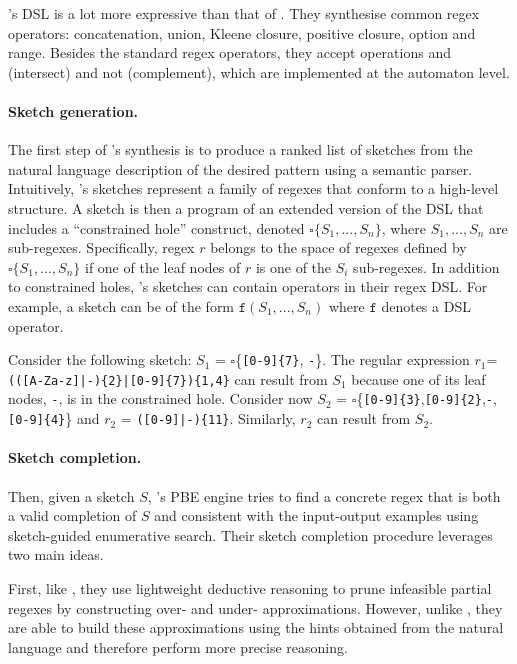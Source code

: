 \Regel's \ac{DSL} is a lot more expressive than that of \AlphaRegex. They synthesise common regex operators: concatenation, union, Kleene closure, positive closure, option and range. Besides the standard regex operators, they accept operations and (intersect) and not (complement), which are implemented at the automaton level.

\paragraph{Sketch generation.}
The first step of \Regel's synthesis is to produce a ranked list of sketches from the natural language description of the desired pattern using a semantic parser. Intuitively, \Regel's sketches represent a family of regexes that conform to a high-level structure. A sketch is then a program of an extended version of the \ac{DSL} that includes a ``constrained hole'' construct, denoted \(\square\{S_1, ..., S_n\}\), where \(S_1, ..., S_n\) are sub-regexes.
Specifically, regex \(r\) belongs to the space of
regexes defined by \(\square\{S_1, ..., S_n\}\) if one of the leaf nodes of \(r\) is one of the \(S_i\) sub-regexes.
%
In addition to constrained holes, \Regel's sketches can contain operators in their regex DSL. For example, a sketch can be of the form \(\texttt{f}(S_1, ..., S_n)\) where \(\texttt{f}\) denotes a \ac{DSL} operator.


\begin{example}
Consider the following \Regel sketch:  \(S_1\) = \(\square\)\{\verb`[0-9]{7}`, \texttt{-}\}. The regular expression \(r_1\)=\verb`(([A-Za-z]|-){2}|[0-9]{7}){1,4}` can result from \(S_1\) because one of its leaf nodes, \texttt{-}, is in the constrained hole.
%
Consider now \(S_2\) = \(\square\)\{\verb`[0-9]{3}`,\verb`[0-9]{2}`,\texttt{-},\verb`[0-9]{4}`\} and \(r_2\) = \verb`([0-9]|-){11}`. Similarly, \(r_2\) can result from \(S_2\).
\end{example}

\paragraph{Sketch completion.}
Then, given a sketch \(S\), \Regel's \ac{PBE} engine tries to find a concrete regex that is both a valid completion of \(S\) and consistent with the input-output examples using sketch-guided enumerative search. Their sketch completion procedure leverages two main ideas.

First, like \AlphaRegex, they use lightweight deductive reasoning to prune infeasible partial regexes by constructing over- and under- approximations. However, unlike \AlphaRegex, they are able to build these approximations using the hints obtained from the natural language and therefore perform more precise reasoning.


